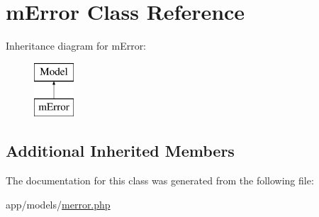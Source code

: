 \hypertarget{classmError}{}\section{m\+Error Class Reference}
\label{classmError}
Inheritance diagram for m\+Error\+:\begin{figure}[H]
\begin{center}
\leavevmode
\includegraphics[height=2.000000cm]{classmError}
\end{center}
\end{figure}
\subsection*{Additional Inherited Members}


The documentation for this class was generated from the following file\+:\begin{DoxyCompactItemize}
\item 
app/models/\hyperlink{merror_8php}{merror.\+php}\end{DoxyCompactItemize}
